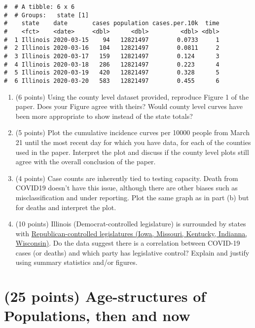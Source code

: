 \documentclass[letterpaper,12pt,twoside,]{pinp}
\providecommand{\tightlist}{%
  \setlength{\itemsep}{0pt}\setlength{\parskip}{0pt}}
\begin{document}
\begin{ShadedResult}
\begin{verbatim}
#  # A tibble: 6 x 6
#  # Groups:   state [1]
#    state    date       cases population cases.per.10k  time
#    <fct>    <date>     <dbl>      <dbl>         <dbl> <dbl>
#  1 Illinois 2020-03-15    94   12821497        0.0733     1
#  2 Illinois 2020-03-16   104   12821497        0.0811     2
#  3 Illinois 2020-03-17   159   12821497        0.124      3
#  4 Illinois 2020-03-18   286   12821497        0.223      4
#  5 Illinois 2020-03-19   420   12821497        0.328      5
#  6 Illinois 2020-03-20   583   12821497        0.455      6
\end{verbatim}
\end{ShadedResult}

\begin{enumerate}
\def\labelenumi{\alph{enumi})}
\tightlist
\item
  (6 points) Using the county level dataset provided, reproduce Figure 1
  of the paper. Does your Figure agree with theirs? Would county level
  curves have been more appropriate to show instead of the state totals?
\item
  (5 points) Plot the cumulative incidence curves per 10000 people from
  March 21 until the most recent day for which you have data, for each
  of the counties used in the paper. Interpret the plot and discuss if
  the county level plots still agree with the overall conclusion of the
  paper.
\item
  (4 points) Case counts are inherently tied to testing capacity. Death
  from COVID19 doesn't have this issue, although there are other biases
  such as misclassification and under reporting. Plot the same graph as
  in part (b) but for deaths and interpret the plot.
\item
  (10 points) Illinois (Democrat-controlled legislature) is surrounded
  by states with
  \href{https://www.ncsl.org/research/about-state-legislatures/partisan-composition.aspx\#}{Republican-controlled
  legislatures (Iowa, Missouri, Kentucky, Indianna, Wisconsin)}. Do the
  data suggest there is a correlation between COVID-19 cases (or deaths)
  and which party has legislative control? Explain and justify using
  summary statistics and/or figures.
\end{enumerate}

\newpage

\hypertarget{points-age-structures-of-populations-then-and-now}{%
\section{(25 points) Age-structures of Populations, then and
now}\label{points-age-structures-of-populations-then-and-now}}
\end{document}
